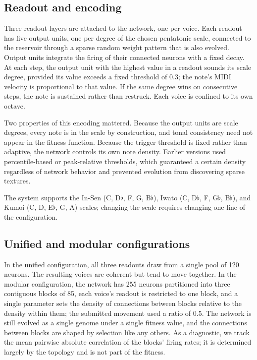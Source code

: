 \documentclass[conference]{IEEEtran}
\newcommand{\fl}{$\flat$}
\begin{document}
\subsection{Readout and encoding}
\label{sec:readout}

Three readout layers are attached to the network, one per voice. Each readout has five output units, one per degree of the chosen pentatonic scale, connected to the reservoir through a sparse random weight pattern that is also evolved. Output units integrate the firing of their connected neurons with a fixed decay. At each step, the output unit with the highest value in a readout sounds its scale degree, provided its value exceeds a fixed threshold of 0.3; the note's MIDI velocity is proportional to that value. If the same degree wins on consecutive steps, the note is sustained rather than restruck. Each voice is confined to its own octave.

Two properties of this encoding mattered. Because the output units are scale degrees, every note is in the scale by construction, and tonal consistency need not appear in the fitness function. Because the trigger threshold is fixed rather than adaptive, the network controls its own note density. Earlier versions used percentile-based or peak-relative thresholds, which guaranteed a certain density regardless of network behavior and prevented evolution from discovering sparse textures.

The system supports the In-Sen (C, D\fl, F, G, B\fl), Iwato (C, D\fl, F, G\fl, B\fl), and Kumoi (C, D, E\fl, G, A) scales; changing the scale requires changing one line of the configuration.

\subsection{Unified and modular configurations}

In the unified configuration, all three readouts draw from a single pool of 120 neurons. The resulting voices are coherent but tend to move together. In the modular configuration, the network has 255 neurons partitioned into three contiguous blocks of 85, each voice's readout is restricted to one block, and a single parameter sets the density of connections between blocks relative to the density within them; the submitted movement used a ratio of 0.5. The network is still evolved as a single genome under a single fitness value, and the connections between blocks are shaped by selection like any others. As a diagnostic, we track the mean pairwise absolute correlation of the blocks' firing rates; it is determined largely by the topology and is not part of the fitness.
\end{document}
